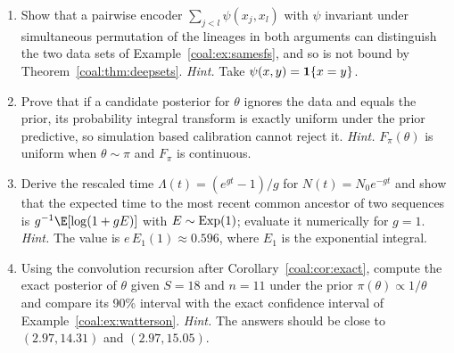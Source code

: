 \begin{enumerate}[label=\arabic*., leftmargin=*]
\item Show that a pairwise encoder $\sum_{j<l}\psi(x_j,x_l)$ with $\psi$ invariant under simultaneous permutation of the lineages in both arguments can distinguish the two data sets of Example~\ref{coal:ex:samesfs}, and so is not bound by Theorem~\ref{coal:thm:deepsets}.
\emph{Hint.} Take $\psi(x,y)=\mathbf{1}\{x=y\}$.

\item Prove that if a candidate posterior for $\theta$ ignores the data and equals the prior, its probability integral transform is exactly uniform under the prior predictive, so simulation based calibration cannot reject it.
\emph{Hint.} $F_\pi(\theta)$ is uniform when $\theta\sim\pi$ and $F_\pi$ is continuous.

\item Derive the rescaled time $\Lambda(t)=(e^{gt}-1)/g$ for $N(t)=N_0e^{-gt}$ and show that the expected time to the most recent common ancestor of two sequences is $g^{-1}\E[\log(1+gE)]$ with $E\sim\mathrm{Exp}(1)$; evaluate it numerically for $g=1$.
\emph{Hint.} The value is $e\,E_1(1)\approx0.596$, where $E_1$ is the exponential integral.

\item Using the convolution recursion after Corollary~\ref{coal:cor:exact}, compute the exact posterior of $\theta$ given $S=18$ and $n=11$ under the prior $\pi(\theta)\propto1/\theta$ and compare its 90\% interval with the exact confidence interval of Example~\ref{coal:ex:watterson}.
\emph{Hint.} The answers should be close to $(2.97,14.31)$ and $(2.97,15.05)$.
\end{enumerate}

